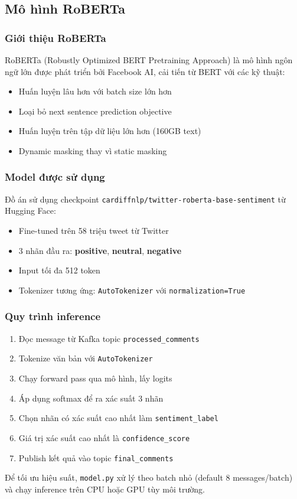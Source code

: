 \subsection{Mô hình RoBERTa}

\subsubsection{Giới thiệu RoBERTa}

RoBERTa (Robustly Optimized BERT Pretraining Approach) là mô hình ngôn ngữ lớn được phát triển bởi Facebook AI, cải tiến từ BERT với các kỹ thuật:
\begin{itemize}
    \item Huấn luyện lâu hơn với batch size lớn hơn
    \item Loại bỏ next sentence prediction objective
    \item Huấn luyện trên tập dữ liệu lớn hơn (160GB text)
    \item Dynamic masking thay vì static masking
\end{itemize}

\subsubsection{Model được sử dụng}

Đồ án sử dụng checkpoint \texttt{cardiffnlp/twitter-roberta-base-sentiment} từ Hugging Face:
\begin{itemize}
    \item Fine-tuned trên 58 triệu tweet từ Twitter
    \item 3 nhãn đầu ra: \textbf{positive}, \textbf{neutral}, \textbf{negative}
    \item Input tối đa 512 token
    \item Tokenizer tương ứng: \texttt{AutoTokenizer} với \texttt{normalization=True}
\end{itemize}

\subsubsection{Quy trình inference}

\begin{enumerate}
    \item Đọc message từ Kafka topic \texttt{processed\_comments}
    \item Tokenize văn bản với \texttt{AutoTokenizer}
    \item Chạy forward pass qua mô hình, lấy logits
    \item Áp dụng softmax để ra xác suất 3 nhãn
    \item Chọn nhãn có xác suất cao nhất làm \texttt{sentiment\_label}
    \item Giá trị xác suất cao nhất là \texttt{confidence\_score}
    \item Publish kết quả vào topic \texttt{final\_comments}
\end{enumerate}

Để tối ưu hiệu suất, \texttt{model.py} xử lý theo batch nhỏ (default 8 messages/batch) và chạy inference trên CPU hoặc GPU tùy môi trường.
